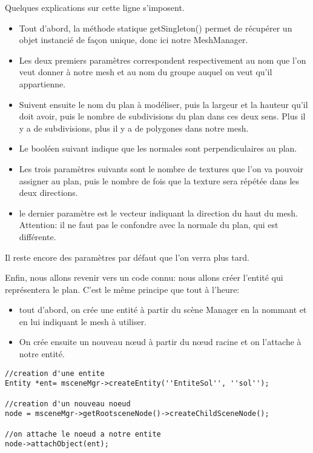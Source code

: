 Quelques explications sur cette ligne s'imposent. 
\begin{itemize}
\item Tout d'abord, la méthode statique getSingleton() permet de récupérer un objet instancié de façon unique, donc ici notre MeshManager.
\item Les deux premiers paramètres correspondent respectivement au nom que l'on veut donner à notre mesh et au nom du groupe auquel on veut qu'il appartienne. 
\item Suivent ensuite le nom du plan à modéliser, puis la largeur et la hauteur qu'il doit avoir, puis le nombre de subdivisions du plan dans ces deux sens. Plus il y a de subdivisions, plus il y a de polygones dans notre mesh. 
\item Le booléen suivant indique que les normales sont perpendiculaires au plan.
\item Les trois paramètres suivants sont le nombre de textures que l'on va pouvoir assigner au plan, puis le nombre de fois que la texture sera répétée dans les deux directions. 
\item le dernier paramètre est le vecteur indiquant la direction du haut du mesh. Attention: il ne faut pas le confondre avec la normale du plan, qui est différente.
\end{itemize}

Il reste encore des paramètres par défaut que l'on verra plus tard.

Enfin, nous allons revenir vers un code connu: nous allons créer l'entité qui représentera le plan. C'est le même principe que tout à l'heure:
\begin{itemize} 
\item tout d'abord, on crée une entité à partir du scène Manager en la nommant et en lui indiquant le mesh à utiliser. 
\item On crée ensuite un nouveau nœud à partir du nœud racine et on l'attache à notre entité.
\end{itemize}

\begin{lstlisting}
//creation d'une entite
Entity *ent= msceneMgr->createEntity(''EntiteSol'', ''sol'');

//creation d'un nouveau noeud
node = msceneMgr->getRootsceneNode()->createChildSceneNode();

//on attache le noeud a notre entite
node->attachObject(ent);
\end{lstlisting}




